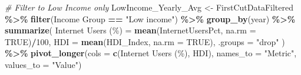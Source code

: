\documentclass[
]{article}
\newenvironment{Shaded}{\begin{snugshade}}{\end{snugshade}}
\newcommand{\AttributeTok}[1]{\textcolor[rgb]{0.13,0.29,0.53}{#1}}
\newcommand{\CommentTok}[1]{\textcolor[rgb]{0.56,0.35,0.01}{\textit{#1}}}
\newcommand{\ConstantTok}[1]{\textcolor[rgb]{0.56,0.35,0.01}{#1}}
\newcommand{\DecValTok}[1]{\textcolor[rgb]{0.00,0.00,0.81}{#1}}
\newcommand{\FunctionTok}[1]{\textcolor[rgb]{0.13,0.29,0.53}{\textbf{#1}}}
\newcommand{\NormalTok}[1]{#1}
\newcommand{\OtherTok}[1]{\textcolor[rgb]{0.56,0.35,0.01}{#1}}
\newcommand{\SpecialCharTok}[1]{\textcolor[rgb]{0.81,0.36,0.00}{\textbf{#1}}}
\newcommand{\StringTok}[1]{\textcolor[rgb]{0.31,0.60,0.02}{#1}}
\begin{document}
\begin{Shaded}
\begin{Highlighting}[]
\CommentTok{\# Filter to Low Income only}
\NormalTok{LowIncome\_Yearly\_Avg }\OtherTok{\textless{}{-}}\NormalTok{ FirstCutDataFiltered }\SpecialCharTok{\%\textgreater{}\%}
  \FunctionTok{filter}\NormalTok{(}\StringTok{\textasciigrave{}}\AttributeTok{Income Group}\StringTok{\textasciigrave{}} \SpecialCharTok{==} \StringTok{"Low income"}\NormalTok{) }\SpecialCharTok{\%\textgreater{}\%}
  \FunctionTok{group\_by}\NormalTok{(year) }\SpecialCharTok{\%\textgreater{}\%}
  \FunctionTok{summarize}\NormalTok{(}
    \StringTok{\textasciigrave{}}\AttributeTok{Internet Users (\%)}\StringTok{\textasciigrave{}} \OtherTok{=} \FunctionTok{mean}\NormalTok{(InternetUsersPct, }\AttributeTok{na.rm =} \ConstantTok{TRUE}\NormalTok{)}\SpecialCharTok{/}\DecValTok{100}\NormalTok{,}
    \StringTok{\textasciigrave{}}\AttributeTok{HDI}\StringTok{\textasciigrave{}} \OtherTok{=} \FunctionTok{mean}\NormalTok{(HDI\_Index, }\AttributeTok{na.rm =} \ConstantTok{TRUE}\NormalTok{),}
    \AttributeTok{.groups =} \StringTok{"drop"}
\NormalTok{  ) }\SpecialCharTok{\%\textgreater{}\%}
  \FunctionTok{pivot\_longer}\NormalTok{(}\AttributeTok{cols =} \FunctionTok{c}\NormalTok{(}\StringTok{\textasciigrave{}}\AttributeTok{Internet Users (\%)}\StringTok{\textasciigrave{}}\NormalTok{, }\StringTok{\textasciigrave{}}\AttributeTok{HDI}\StringTok{\textasciigrave{}}\NormalTok{),}
               \AttributeTok{names\_to =} \StringTok{"Metric"}\NormalTok{, }\AttributeTok{values\_to =} \StringTok{"Value"}\NormalTok{)}


\end{Highlighting}
\end{Shaded}
\end{document}
